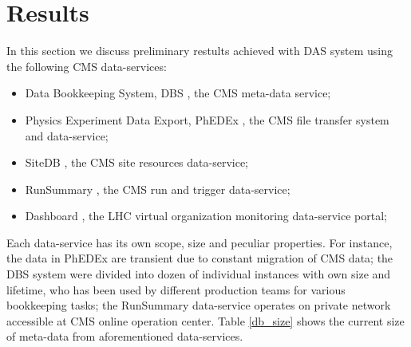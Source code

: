 \documentclass[a4paper]{jpconf}
\begin{document}

\section{Results\label{Results}}
In this section we discuss preliminary restults achieved with DAS system
using the following CMS data-services:
\begin{itemize}
\item Data Bookkeeping System, DBS \cite{DBS}, the CMS meta-data service;
\item Physics Experiment Data Export, PhEDEx \cite {PhEDEx}, the 
CMS file transfer system and data-service;
\item SiteDB \cite{SiteDB}, the CMS site resources data-service;
\item RunSummary \cite{RunSummary}, the CMS run and trigger data-service;
\item Dashboard \cite{Dashboard}, the LHC virtual organization
monitoring data-service portal;
\end{itemize}
Each data-service has its own scope, size and peculiar properties. 
For instance, the data in PhEDEx are transient due to constant 
migration of CMS data; the DBS system were divided into dozen 
of individual instances with own size and lifetime, who has been used by different production 
teams for various bookkeeping tasks; the RunSummary data-service
operates on private network accessible at CMS online operation center.
Table \ref{db_size} shows the current size of meta-data from aforementioned 
data-services.
\end{document}
